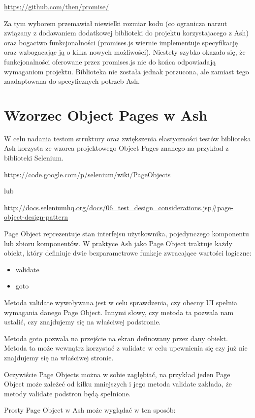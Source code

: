 \documentclass[brudnopis]{xmgr}
\begin{document}
\url{https://github.com/then/promise/}

Za tym wyborem przemawiał niewielki rozmiar kodu (co ogranicza narzut związany z dodawaniem dodatkowej biblioteki do projektu korzystajacego z Ash) oraz bogactwo funkcjonalności (promises.js wiernie implementuje specyfikację oraz wzbogacając ją o kilka  nowych możliwości). Niestety szybko okazało się, że funkcjonalności oferowane przez promises.js nie do końca odpowiadają wymaganiom projektu. Biblioteka nie została jednak porzucona, ale zamiast tego zaadaptowana do specyficznych potrzeb Ash.  

\section{Wzorzec Object Pages w Ash}

W celu nadania testom struktury oraz zwiększenia elastyczności testów biblioteka Ash korzysta ze wzorca projektowego Object Pages znanego na przykład z biblioteki Selenium. 

\url{https://code.google.com/p/selenium/wiki/PageObjects}

lub

\url{http://docs.seleniumhq.org/docs/06\_test\_design\_considerations.jsp\#page-object-design-pattern}

Page Object reprezentuje stan interfejsu użytkownika, pojedynczego komponentu lub zbioru komponentów. W praktyce Ash jako Page Object traktuje każdy obiekt, który definiuje dwie bezparametrowe funkcje zwracające wartości logiczne:

\begin{itemize}
  \item validate
  \item goto
\end{itemize}

Metoda validate wywoływana jest w celu sprawdzenia, czy obecny UI spełnia wymagania danego Page Object. Innymi słowy, czy metoda ta pozwala nam ustalić, czy znajdujemy się na właściwej podstronie. 

Metoda goto pozwala na przejście na ekran definowany przez dany obiekt. Metoda ta może wewnątrz korzystać z validate w celu upewnienia się czy już nie znajdujemy się na właściwej stronie. 

Oczywiście Page Objects można w sobie zagłębiać, na przykład jeden Page Object może zależeć od kilku mniejszych i jego metoda validate zakłada, że metody validate podstron będą spełnione. 

Prosty Page Object w Ash może wyglądać w ten sposób:
\end{document}
